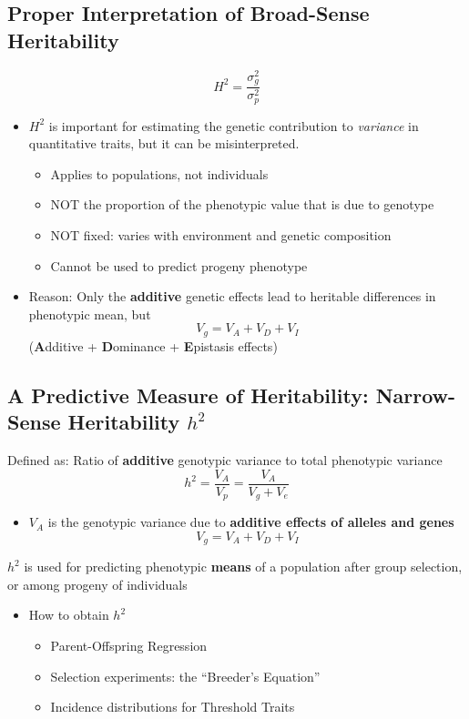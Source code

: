 \documentclass[10pt]{article}
\begin{document}
\subsection*{Proper Interpretation of Broad-Sense Heritability}
\[H^2 = \frac{\sigma_g^2}{\sigma_p^2}\]
\begin{itemize}
	\item $H^2$ is important for estimating the genetic contribution to \textit{variance} in quantitative traits, but it can be misinterpreted.
	\begin{itemize}
	    \item Applies to populations, not individuals
	    \item NOT the proportion of the phenotypic value that is due to genotype
	    \item NOT fixed: varies with environment and genetic composition
	    \item Cannot be used to predict progeny phenotype
    \end{itemize}
    \item Reason: Only the \textbf{additive} genetic effects lead to heritable differences in phenotypic mean, but 
    \[V_g = V_A + V_D + V_I\]
    (\textbf{A}dditive + \textbf{D}ominance + \textbf{E}pistasis effects)
\end{itemize}

\subsection*{A Predictive Measure of Heritability: Narrow-Sense Heritability $h^2$}
Defined as: Ratio of \textbf{additive} genotypic variance to total phenotypic variance
\[h^2 = \frac{V_A}{V_p} = \frac{V_A}{V_g + V_e}\]
\begin{itemize}
	\item $V_A$ is the genotypic variance due to \textbf{additive effects of alleles and genes}
	\[V_g = V_A + V_D + V_I\]
\end{itemize}
$h^2$ is used for predicting phenotypic \textbf{means} of a population after group selection, or among progeny of individuals
\begin{itemize}
	\item How to obtain $h^2$
	\begin{itemize}
	    \item Parent-Offspring Regression
	    \item Selection experiments: the ``Breeder's Equation''
	    \item Incidence distributions for Threshold Traits
    \end{itemize}
\end{itemize}
\end{document}
